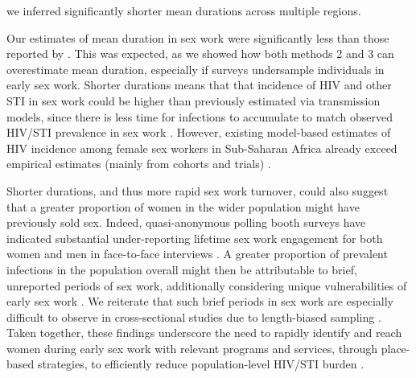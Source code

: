 we inferred significantly shorter mean durations across multiple regions.
\par %
Our estimates of mean duration in sex work were
significantly less than those reported by \citet{Fazito2012}.
This was expected, as we showed how both methods 2 and 3 can overestimate mean duration,
especially if surveys undersample individuals in early sex work.
Shorter durations means that that incidence of HIV and other STI in sex work
could be higher than previously estimated via transmission models,
since there is less time for infections to accumulate
to match observed HIV/STI prevalence in sex work \cite{Knight2020,Anderegg2024}.
However, existing model-based estimates of HIV incidence
among female sex workers in Sub-Saharan Africa
already exceed empirical estimates (mainly from cohorts and trials)
\cite{Jones2024,Stevens2024inc}.
\par %
Shorter durations, and thus more rapid sex work turnover, could also suggest that
a greater proportion of women in the wider population might have previously sold sex.
Indeed, quasi-anonymous polling booth surveys have indicated
substantial under-reporting lifetime sex work engagement for both women and men
in face-to-face interviews \cite{Lowndes2012,Behanzin2013}.
A greater proportion of prevalent infections in the population overall
might then be attributable to brief, unreported periods of sex work,
additionally considering unique vulnerabilities of early sex work \cite{Cheuk2020}.
We reiterate that such brief periods in sex work are
especially difficult to observe in cross-sectional studies
due to length-biased sampling \cite{Ross2003}.
Taken together, these findings underscore
the need to rapidly identify and reach women during early sex work
with relevant programs and services, \eg through place-based strategies,
to efficiently reduce population-level HIV/STI burden
\cite{Cheuk2020,Neufeld2023,Bhattacharjee2023,McClarty2026}.
\par %
